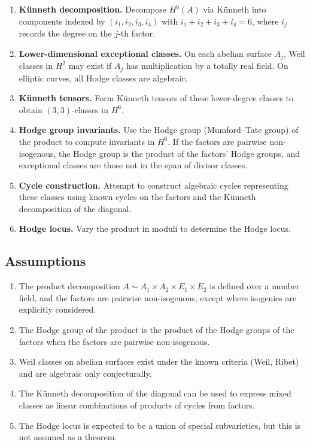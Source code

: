 \documentclass{article}
\begin{document}
\begin{enumerate}
  \item \textbf{K\"unneth decomposition.} Decompose $H^6(A)$ via K\"unneth into components indexed by $(i_1,i_2,i_3,i_4)$ with $i_1+i_2+i_3+i_4 = 6$, where $i_j$ records the degree on the $j$-th factor.
  \item \textbf{Lower-dimensional exceptional classes.} On each abelian surface $A_j$, Weil classes in $H^2$ may exist if $A_j$ has multiplication by a totally real field. On elliptic curves, all Hodge classes are algebraic.
  \item \textbf{K\"unneth tensors.} Form K\"unneth tensors of these lower-degree classes to obtain $(3,3)$-classes in $H^6$.
  \item \textbf{Hodge group invariants.} Use the Hodge group (Mumford--Tate group) of the product to compute invariants in $H^6$. If the factors are pairwise non-isogenous, the Hodge group is the product of the factors' Hodge groups, and exceptional classes are those not in the span of divisor classes.
  \item \textbf{Cycle construction.} Attempt to construct algebraic cycles representing these classes using known cycles on the factors and the K\"unneth decomposition of the diagonal.
  \item \textbf{Hodge locus.} Vary the product in moduli to determine the Hodge locus.
\end{enumerate}

\subsection{Assumptions}
\label{subsec:assumptions}

\begin{enumerate}
  \item The product decomposition $A \sim A_1 \times A_2 \times E_1 \times E_2$ is defined over a number field, and the factors are pairwise non-isogenous, except where isogenies are explicitly considered.
  \item The Hodge group of the product is the product of the Hodge groups of the factors when the factors are pairwise non-isogenous.
  \item Weil classes on abelian surfaces exist under the known criteria (Weil, Ribet) and are algebraic only conjecturally.
  \item The K\"unneth decomposition of the diagonal can be used to express mixed classes as linear combinations of products of cycles from factors.
  \item The Hodge locus is expected to be a union of special subvarieties, but this is not assumed as a theorem.
\end{enumerate}
\end{document}
